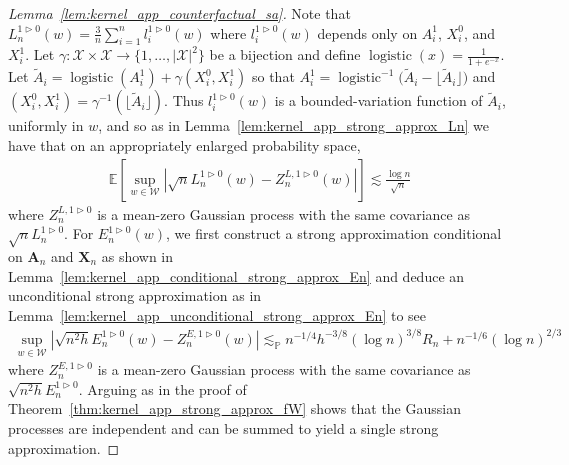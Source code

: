 \documentclass[11pt,lof]{puthesis}
\renewcommand{\P}{\ensuremath{\mathbb{P}}}
\newcommand{\E}{\ensuremath{\mathbb{E}}}
\newcommand{\bX}{\ensuremath{\mathbf{X}}}
\newcommand{\bA}{\ensuremath{\mathbf{A}}}
\newcommand{\cX}{\ensuremath{\mathcal{X}}}
\newcommand{\cW}{\ensuremath{\mathcal{W}}}
\DeclareMathOperator*{\logistic}{logistic}
\theoremstyle{break}
\theoremstyle{proof}
\newtheorem{proof}{Proof}
\begin{document}
\begin{proof}[Lemma~\ref{lem:kernel_app_counterfactual_sa}]

  Note that
  $L_n^{1 \triangleright 0}(w)
  = \frac 3n \sum_{i=1}^n l_i^{1 \triangleright 0}(w)$
  where $l_i^{1 \triangleright 0}(w)$ depends only on
  $A_i^1$, $X_i^0$, and $X_i^1$.
  Let $\gamma: \cX \times \cX \to \{1, \ldots, |\cX|^2\}$
  be a bijection and
  define $\logistic(x) = \frac{1}{1+e^{-x}}$.
  Let $\tilde A_i = \logistic(A_i^1) + \gamma(X_i^0, X_i^1)$ so that $A_i^1 =
  \logistic^{-1}\big(\tilde A_i - \lfloor \tilde A_i \rfloor\big)$ and $(X_i^0,
  X_i^1) = \gamma^{-1}(\lfloor \tilde A_i \rfloor)$.
  Thus $l_i^{1 \triangleright 0}(w)$ is a bounded-variation function of $\tilde
  A_i$, uniformly in $w$, and so as in
  Lemma~\ref{lem:kernel_app_strong_approx_Ln} we have that on an appropriately
  enlarged probability space,
  \begin{align*}
    \E\left[
      \sup_{w \in \cW}
      \left|
      \sqrt n L_n^{1 \triangleright 0}(w)
      - Z_n^{L, 1 \triangleright 0}(w)
      \right|
    \right]
    \lesssim
    \frac{\log n}{\sqrt n}
  \end{align*}
  where $Z_n^{L, 1 \triangleright 0}$ is a mean-zero
  Gaussian process with the same covariance as
  $\sqrt n L_n^{1 \triangleright 0}$.
  For $E_n^{1 \triangleright 0}(w)$,
  we first construct a strong approximation conditional on
  $\bA_n$ and $\bX_n$ as shown in
  Lemma~\ref{lem:kernel_app_conditional_strong_approx_En}
  and deduce an unconditional strong approximation as in
  Lemma~\ref{lem:kernel_app_unconditional_strong_approx_En} to see
  \begin{align*}
    \sup_{w \in \cW}
    \left|
    \sqrt{n^2h} E_n^{1 \triangleright 0}(w)
    - Z_n^{E, 1 \triangleright 0}(w)
    \right|
    \lesssim_\P
    n^{-1/4} h^{-3/8} (\log n)^{3/8} R_n
    + n^{-1/6} (\log n)^{2/3}
  \end{align*}
  where $Z_n^{E, 1 \triangleright 0}$ is a mean-zero
  Gaussian process with the same covariance as
  $\sqrt{n^2h} E_n^{1 \triangleright 0}$.
  Arguing as in the proof of Theorem~\ref{thm:kernel_app_strong_approx_fW}
  shows that the Gaussian processes are independent
  and can be summed to yield a single strong approximation.
\end{proof}
\end{document}
